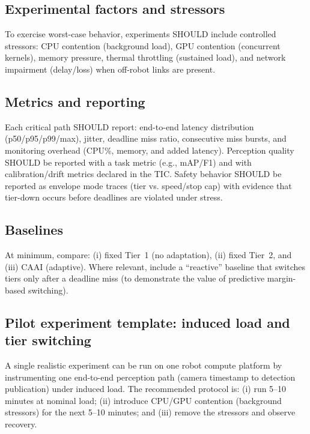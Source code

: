 \documentclass[smallextended]{svjour3}
\begin{document}
\subsection{Experimental factors and stressors}

To exercise worst-case behavior, experiments SHOULD include controlled stressors:
CPU contention (background load), GPU contention (concurrent kernels), memory
pressure, thermal throttling (sustained load), and network impairment (delay/loss)
when off-robot links are present.

\subsection{Metrics and reporting}

Each critical path SHOULD report: end-to-end latency distribution (p50/p95/p99/max),
jitter, deadline miss ratio, consecutive miss bursts, and monitoring overhead
(CPU\%, memory, and added latency). Perception quality SHOULD be reported with a
task metric (e.g., mAP/F1) and with calibration/drift metrics declared in the TIC.
Safety behavior SHOULD be reported as envelope mode traces (tier vs. speed/stop cap)
with evidence that tier-down occurs before deadlines are violated under stress.

\subsection{Baselines}

At minimum, compare: (i) fixed Tier~1 (no adaptation), (ii) fixed Tier~2, and (iii)
CAAI (adaptive). Where relevant, include a ``reactive'' baseline that switches tiers
only after a deadline miss (to demonstrate the value of predictive margin-based switching).

\subsection{Pilot experiment template: induced load and tier switching}
\label{sec:pilot}

A single realistic experiment can be run on one robot compute platform by
instrumenting one end-to-end perception path (camera timestamp to detection
publication) under induced load. The recommended protocol is: (i) run 5--10 minutes
at nominal load; (ii) introduce CPU/GPU contention (background stressors) for the
next 5--10 minutes; and (iii) remove the stressors and observe recovery.
\end{document}
